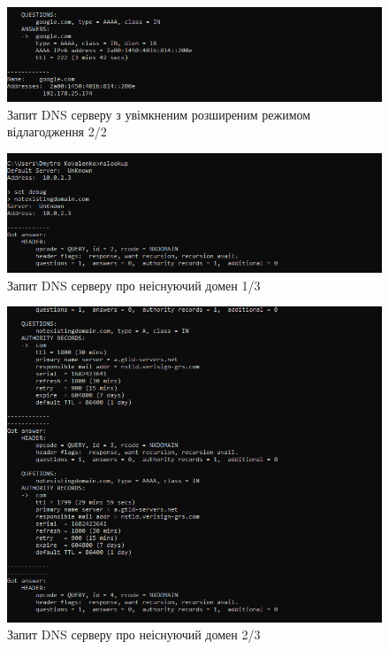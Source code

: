 \documentclass{article}
\begin{document}
\begin{normalsize}
\begin{figure}[H]
	\centering
	\includegraphics[width=\textwidth]{35}
	\caption{Запит DNS серверу з увімкненим розширеним режимом відлагодження 2/2}
\end{figure}
\begin{figure}[H]
	\centering
	\includegraphics[width=\textwidth]{51}
	\caption{Запит DNS серверу про неіснуючий домен 1/3}
\end{figure}
\begin{figure}[H]
	\centering
	\includegraphics[width=\textwidth]{52}
	\caption{Запит DNS серверу про неіснуючий домен 2/3}
\end{figure}
\begin{figure}[H]
	\centering

\end{figure}
\end{normalsize}
\end{document}
